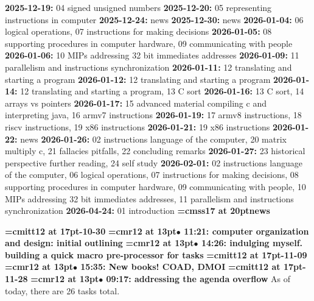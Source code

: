 {\noindent \bf 2025-12-19:} 04 signed unsigned numbers\smallskip
{\noindent \bf 2025-12-20:} 05 representing instructions in computer\smallskip
{\noindent \bf 2025-12-24:} news\smallskip
{\noindent \bf 2025-12-30:} news\smallskip
{\noindent \bf 2026-01-04:} 06 logical operations, 07 instructions for making decisions\smallskip
{\noindent \bf 2026-01-05:} 08 supporting procedures in computer hardware, 09 communicating with people\smallskip
{\noindent \bf 2026-01-06:} 10 MIPs addressing 32 bit immediates addresses\smallskip
{\noindent \bf 2026-01-09:} 11 parallelism and instructions synchronization\smallskip
{\noindent \bf 2026-01-11:} 12 translating and starting a program\smallskip
{\noindent \bf 2026-01-12:} 12 translating and starting a program\smallskip
{\noindent \bf 2026-01-14:} 12 translating and starting a program, 13 C sort\smallskip
{\noindent \bf 2026-01-16:} 13 C sort, 14 arrays vs pointers\smallskip
{\noindent \bf 2026-01-17:} 15 advanced material compiling c and interpreting java, 16 armv7 instructions\smallskip
{\noindent \bf 2026-01-19:} 17 armv8 instructions, 18 riscv instructions, 19 x86 instructions\smallskip
{\noindent \bf 2026-01-21:} 19 x86 instructions\smallskip
{\noindent \bf 2026-01-22:} news\smallskip
{\noindent \bf 2026-01-26:} 02 instructions language of the computer, 20 matrix multiply c, 21 fallacies pitfalls, 22 concluding remarks\smallskip
{\noindent \bf 2026-01-27:} 23 historical perspective further reading, 24 self study\smallskip
{\noindent \bf 2026-02-01:} 02 instructions language of the computer, 06 logical operations, 07 instructions for making decisions, 08 supporting procedures in computer hardware, 09 communicating with people, 10 MIPs addressing 32 bit immediates addresses, 11 parallelism and instructions synchronization\smallskip
{\noindent \bf 2026-04-24:} 01 introduction\smallskip
\vfill \break
{}
{\medskip\noindent\bf\font\titlefont=cmss17 at 20pt\titlefont news}\medskip

{\medskip\noindent\bf\font\titlefont=cmitt12 at 17pt-10-30}\medskip
{\smallskip\noindent\bf\font\titlefont=cmr12 at 13pt\titlefont $\bullet$ 11:21: computer organization and design: initial outlining}\smallskip
{\smallskip\noindent\bf\font\titlefont=cmr12 at 13pt\titlefont $\bullet$ 14:26: indulging myself. building a quick macro pre-processor for tasks}\smallskip
{\medskip\noindent\bf\font\titlefont=cmitt12 at 17pt-11-09}\medskip
{\smallskip\noindent\bf\font\titlefont=cmr12 at 13pt\titlefont $\bullet$ 15:35: New books! COAD, DMOI}\smallskip
{\medskip\noindent\bf\font\titlefont=cmitt12 at 17pt-11-28}\medskip
{\smallskip\noindent\bf\font\titlefont=cmr12 at 13pt\titlefont $\bullet$ 09:17: addressing the agenda overflow}\smallskip
As of today, there are 26 tasks total.
\par

